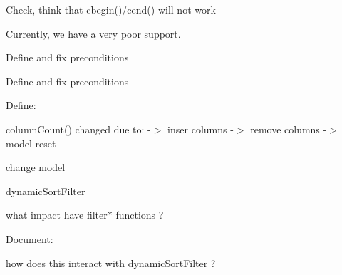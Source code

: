 \begin{DoxyRefList}
Check, think that cbegin()/cend() will not work 
\item[\label{todo__todo000005}%
\hypertarget{todo__todo000005}{}%
Class \hyperlink{class_mdt_1_1_deploy_utils_1_1_platform}{Mdt\+:\+:Deploy\+Utils\+:\+:Platform} ]Currently, we have a very poor support.  
\item[\label{todo__todo000007}%
\hypertarget{todo__todo000007}{}%
Member \hyperlink{class_mdt_1_1_item_model_1_1_relation_key_copier_a828cf1760009af95346e81860318a97d}{Mdt\+:\+:Item\+Model\+:\+:Relation\+Key\+Copier\+:\+:copy\+All\+Key\+Data} (\hyperlink{class_mdt_1_1_item_model_1_1_row_range}{Row\+Range} child\+Model\+Row\+Range, const Q\+Model\+Index \&parent=Q\+Model\+Index())]Define and fix preconditions  
\item[\label{todo__todo000008}%
\hypertarget{todo__todo000008}{}%
Member \hyperlink{class_mdt_1_1_item_model_1_1_relation_key_copier_afaf09fb0922dba087784d64a172dd61d}{Mdt\+:\+:Item\+Model\+:\+:Relation\+Key\+Copier\+:\+:copy\+Key\+Data} (const \hyperlink{class_mdt_1_1_item_model_1_1_row_list}{Row\+List} \&child\+Model\+Row\+List, \hyperlink{class_mdt_1_1_item_model_1_1_column_range}{Column\+Range} parent\+Model\+Column\+Range)]Define and fix preconditions  
\item[\label{todo__todo000009}%
\hypertarget{todo__todo000009}{}%
Class \hyperlink{class_mdt_1_1_item_model_1_1_sort_proxy_model}{Mdt\+:\+:Item\+Model\+:\+:Sort\+Proxy\+Model} ]Define\+:
\begin{DoxyItemize}
\item column\+Count() changed due to\+: -\/$>$ inser columns -\/$>$ remove columns -\/$>$ model reset
\item change model
\item dynamic\+Sort\+Filter
\item what impact have filter$\ast$ functions ?  
\end{DoxyItemize}
\item[\label{todo__todo000010}%
\hypertarget{todo__todo000010}{}%
Member \hyperlink{class_mdt_1_1_item_model_1_1_sort_proxy_model_a8f8c6a6eb76fe984a21dfe71d696dad1}{Mdt\+:\+:Item\+Model\+:\+:Sort\+Proxy\+Model\+:\+:sort} (int column, Qt\+::\+Sort\+Order sort\+Order=Qt\+::\+Ascending\+Order) override]Document\+:
\begin{DoxyItemize}
\item how does this interact with dynamic\+Sort\+Filter ? 
\end{DoxyItemize}
\end{DoxyRefList}